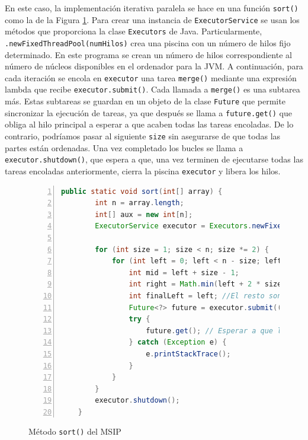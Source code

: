 \documentclass[titlepage]{article}
\begin{document}
En este caso, la implementación iterativa paralela se hace en una función \lstinline{sort() } como la de la Figura \ref{fig:MSIP_sort()}. Para crear una instancia de \lstinline{ExecutorService} se usan los métodos que proporciona la clase \lstinline{Executors} de Java. Particularmente, \lstinline{.newFixedThreadPool(numHilos)} crea una piscina con un número de hilos fijo determinado. En este programa se crean un número de hilos correspondiente al número de núcleos disponibles en el ordenador para la JVM. A continuación, para cada iteración se encola en \lstinline{executor} una tarea \lstinline{merge()} mediante una expresión lambda que recibe \lstinline{executor.submit()}. Cada llamada a \lstinline{merge()} es una subtarea más. Estas subtareas se guardan en un objeto de la clase \lstinline{Future} que permite sincronizar la ejecución de tareas, ya que después se llama a \lstinline{future.get()} que obliga al hilo principal a esperar a que acaben todas las tareas encoladas. De lo contrario, podríamos pasar al siguiente \lstinline{size} sin asegurarse de que todas las partes están ordenadas. Una vez completado los bucles se llama a \lstinline{executor.shutdown()}, que espera a que, una vez terminen de ejecutarse todas las tareas encoladas anteriormente, cierra la piscina \lstinline{executor} y libera los hilos.

\begin{figure}
    \centering
    \begin{lstlisting}[language=java, frame=single, numbers=left]
    public static void sort(int[] array) {
        int n = array.length;
        int[] aux = new int[n];
        ExecutorService executor = Executors.newFixedThreadPool(Runtime.getRuntime().availableProcessors());

        for (int size = 1; size < n; size *= 2) {
            for (int left = 0; left < n - size; left += 2 * size) {
                int mid = left + size - 1;
                int right = Math.min(left + 2 * size - 1, n - 1);
                int finalLeft = left; //El resto son efectivamente finales
                Future<?> future = executor.submit(() -> merge(array, aux, finalLeft, mid, right));
                try {
                    future.get(); // Esperar a que la tarea termine
                } catch (Exception e) {
                    e.printStackTrace();
                }
            }
        }
        executor.shutdown();
    }
    \end{lstlisting}
    
    \caption{Método \lstinline{sort()} del MSIP}
    \label{fig:MSIP_sort()}
\end{figure}
\end{document}

